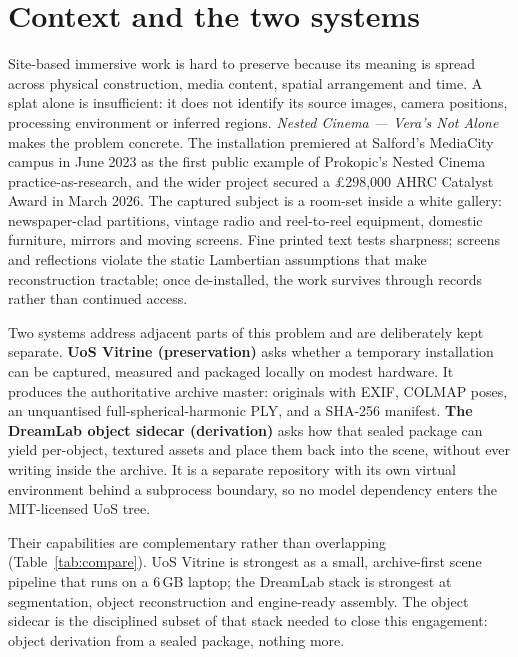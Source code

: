 \section{Context and the two systems}

Site-based immersive work is hard to preserve because its meaning is spread across
physical construction, media content, spatial arrangement and time. A splat alone is
insufficient: it does not identify its source images, camera positions, processing
environment or inferred regions. \textit{Nested Cinema --- Vera's Not Alone} makes the
problem concrete. The installation premiered at Salford's MediaCity campus in June 2023
as the first public example of Prokopic's Nested Cinema practice-as-research, and the
wider project secured a \pounds298{,}000 AHRC Catalyst Award in March 2026. The captured
subject is a room-set inside a white gallery: newspaper-clad partitions, vintage radio
and reel-to-reel equipment, domestic furniture, mirrors and moving screens. Fine printed
text tests sharpness; screens and reflections violate the static Lambertian assumptions
that make reconstruction tractable; once de-installed, the work survives through records
rather than continued access.

Two systems address adjacent parts of this problem and are deliberately kept separate.
\textbf{UoS Vitrine (preservation)} asks whether a temporary installation can be captured,
measured and packaged locally on modest hardware. It produces the authoritative archive
master: originals with EXIF, COLMAP poses, an unquantised full-spherical-harmonic PLY, and
a SHA-256 manifest. \textbf{The DreamLab object sidecar (derivation)} asks how that sealed
package can yield per-object, textured assets and place them back into the scene, without ever
writing inside the archive. It is a separate repository with its own virtual environment
behind a subprocess boundary, so no model dependency enters the MIT-licensed UoS tree.

Their capabilities are complementary rather than overlapping (Table~\ref{tab:compare}). UoS
Vitrine is strongest as a small, archive-first scene pipeline that runs on a 6\,GB laptop;
the DreamLab stack is strongest at segmentation, object reconstruction and engine-ready
assembly. The object sidecar is the disciplined subset of that stack needed to close this
engagement: object derivation from a sealed package, nothing more.

